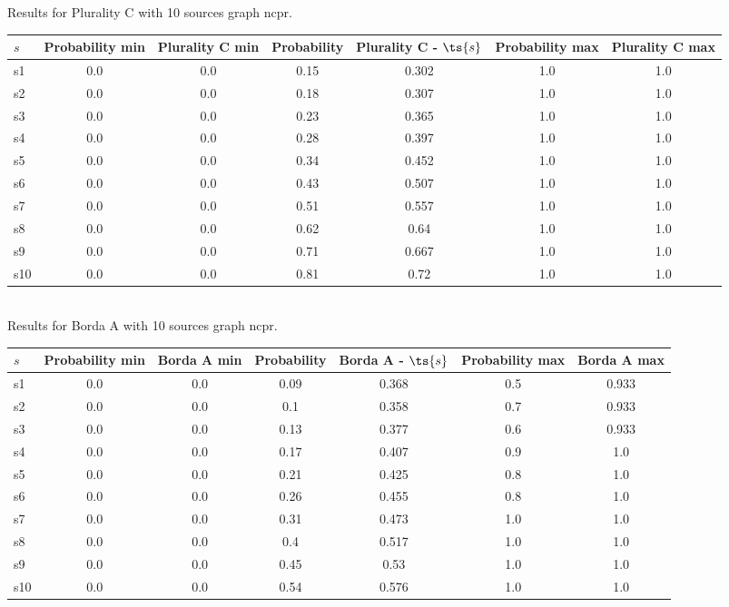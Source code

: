 \documentclass{article}
\begin{document}
\noindent Results for Plurality C with 10 sources graph ncpr.

\noindent\begin{tabular}{|l|c|c|c|c|c|c|}
\hline
$s$& Probability min & Plurality C min & Probability & Plurality C - $\ts{s}$ & Probability max & Plurality C max\\
\hline
s1 &0.0 & 0.0 & 0.15 & 0.302 & 1.0 & 1.0\\
\hline
s2 &0.0 & 0.0 & 0.18 & 0.307 & 1.0 & 1.0\\
\hline
s3 &0.0 & 0.0 & 0.23 & 0.365 & 1.0 & 1.0\\
\hline
s4 &0.0 & 0.0 & 0.28 & 0.397 & 1.0 & 1.0\\
\hline
s5 &0.0 & 0.0 & 0.34 & 0.452 & 1.0 & 1.0\\
\hline
s6 &0.0 & 0.0 & 0.43 & 0.507 & 1.0 & 1.0\\
\hline
s7 &0.0 & 0.0 & 0.51 & 0.557 & 1.0 & 1.0\\
\hline
s8 &0.0 & 0.0 & 0.62 & 0.64 & 1.0 & 1.0\\
\hline
s9 &0.0 & 0.0 & 0.71 & 0.667 & 1.0 & 1.0\\
\hline
s10 &0.0 & 0.0 & 0.81 & 0.72 & 1.0 & 1.0\\
\hline
\end{tabular}\\

\noindent Results for Borda A with 10 sources graph ncpr.

\noindent\begin{tabular}{|l|c|c|c|c|c|c|}
\hline
$s$& Probability min & Borda A min & Probability & Borda A - $\ts{s}$ & Probability max & Borda A max\\
\hline
s1 &0.0 & 0.0 & 0.09 & 0.368 & 0.5 & 0.933\\
\hline
s2 &0.0 & 0.0 & 0.1 & 0.358 & 0.7 & 0.933\\
\hline
s3 &0.0 & 0.0 & 0.13 & 0.377 & 0.6 & 0.933\\
\hline
s4 &0.0 & 0.0 & 0.17 & 0.407 & 0.9 & 1.0\\
\hline
s5 &0.0 & 0.0 & 0.21 & 0.425 & 0.8 & 1.0\\
\hline
s6 &0.0 & 0.0 & 0.26 & 0.455 & 0.8 & 1.0\\
\hline
s7 &0.0 & 0.0 & 0.31 & 0.473 & 1.0 & 1.0\\
\hline
s8 &0.0 & 0.0 & 0.4 & 0.517 & 1.0 & 1.0\\
\hline
s9 &0.0 & 0.0 & 0.45 & 0.53 & 1.0 & 1.0\\
\hline
s10 &0.0 & 0.0 & 0.54 & 0.576 & 1.0 & 1.0\\
\hline
\end{tabular}\\
\end{document}
